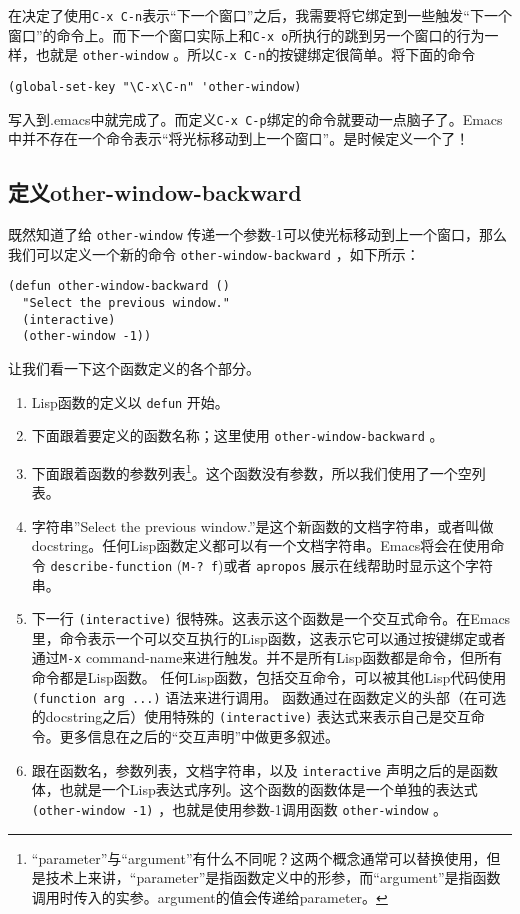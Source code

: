 在决定了使用\verb|C-x C-n|表示“下一个窗口”之后，我需要将它绑定到一些触发“下一个窗口”的命令上。而下一个窗口实际上和\verb|C-x o|所执行的跳到另一个窗口的行为一样，也就是 \texttt{other-window} 。所以\verb|C-x C-n|的按键绑定很简单。将下面的命令

\begin{verbatim}
(global-set-key "\C-x\C-n" 'other-window)
\end{verbatim}

写入到.emacs中就完成了。而定义\verb|C-x C-p|绑定的命令就要动一点脑子了。Emacs中并不存在一个命令表示“将光标移动到上一个窗口”。是时候定义一个了！

\subsection{定义other-window-backward}
\label{section:02-Defining-other-window-backward}

既然知道了给 \texttt{other-window} 传递一个参数-1可以使光标移动到上一个窗口，那么我们可以定义一个新的命令 \texttt{other-window-backward} ，如下所示：

\begin{verbatim}
(defun other-window-backward ()
  "Select the previous window."
  (interactive)
  (other-window -1))
\end{verbatim}

让我们看一下这个函数定义的各个部分。

\begin{enumerate}
  \item Lisp函数的定义以 \texttt{defun} 开始。
  \item 下面跟着要定义的函数名称；这里使用 \texttt{other-window-backward} 。
  \item 下面跟着函数的参数列表\footnote{“parameter”与“argument”有什么不同呢？这两个概念通常可以替换使用，但是技术上来讲，“parameter”是指函数定义中的形参，而“argument”是指函数调用时传入的实参。argument的值会传递给parameter。}。这个函数没有参数，所以我们使用了一个空列表。
  \item 字符串”Select the previous window.”是这个新函数的文档字符串，或者叫做docstring。任何Lisp函数定义都可以有一个文档字符串。Emacs将会在使用命令 \texttt{describe-function} (\verb|M-? f|)或者 \texttt{apropos} 展示在线帮助时显示这个字符串。
  \item 下一行 \texttt{(interactive)} 很特殊。这表示这个函数是一个交互式命令。在Emacs里，命令表示一个可以交互执行的Lisp函数，这表示它可以通过按键绑定或者通过\verb|M-x| command-name来进行触发。并不是所有Lisp函数都是命令，但所有命令都是Lisp函数。
任何Lisp函数，包括交互命令，可以被其他Lisp代码使用 \texttt{(function arg ...)} 语法来进行调用。
函数通过在函数定义的头部（在可选的docstring之后）使用特殊的 \texttt{(interactive)} 表达式来表示自己是交互命令。更多信息在之后的“交互声明”中做更多叙述。
  \item 跟在函数名，参数列表，文档字符串，以及 \texttt{interactive} 声明之后的是函数体，也就是一个Lisp表达式序列。这个函数的函数体是一个单独的表达式 \texttt{(other-window -1)} ，也就是使用参数-1调用函数 \texttt{other-window} 。
\end{enumerate}

